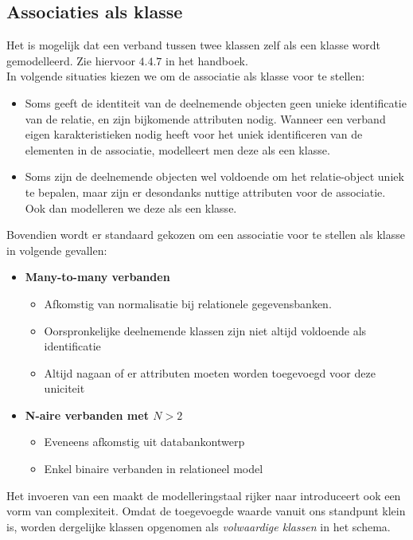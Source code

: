 \documentclass[../main.tex]{subfiles}
\begin{document}
\subsection{Associaties als klasse}
Het is mogelijk dat een verband tussen twee klassen zelf als een klasse wordt gemodelleerd. Zie hiervoor $4.4.7$ in het handboek.\\
In volgende situaties kiezen we om de associatie als klasse voor te stellen:
\begin{itemize}
	\item Soms geeft de identiteit van de deelnemende objecten geen unieke identificatie van de relatie, en zijn bijkomende attributen nodig. Wanneer een verband eigen karakteristieken nodig heeft voor het uniek identificeren van de elementen in de associatie, modelleert men deze als een klasse.
	\item Soms zijn de deelnemende objecten wel voldoende om het relatie-object uniek te bepalen, maar zijn er desondanks nuttige attributen voor de associatie. Ook dan modelleren we deze als een klasse.
\end{itemize}
Bovendien wordt er standaard gekozen om een associatie voor te stellen als klasse in volgende gevallen:
\begin{itemize}
	\item \textbf{Many-to-many verbanden}
	\begin{itemize}
		\item Afkomstig van normalisatie bij relationele gegevensbanken.
		\item Oorspronkelijke deelnemende klassen zijn niet altijd voldoende als identificatie
		\item Altijd nagaan of er attributen moeten worden toegevoegd  voor deze uniciteit
	\end{itemize}
	\item \textbf{N-aire verbanden met $N > 2$}
	\begin{itemize}
		\item Eveneens afkomstig uit databankontwerp
		\item Enkel binaire verbanden in relationeel model
	\end{itemize}
\end{itemize}
Het invoeren van een  maakt de modelleringstaal rijker naar introduceert ook een vorm van complexiteit. Omdat de toegevoegde waarde vanuit ons standpunt klein is, worden dergelijke klassen opgenomen als \textit{volwaardige klassen} in het schema.
\end{document}
